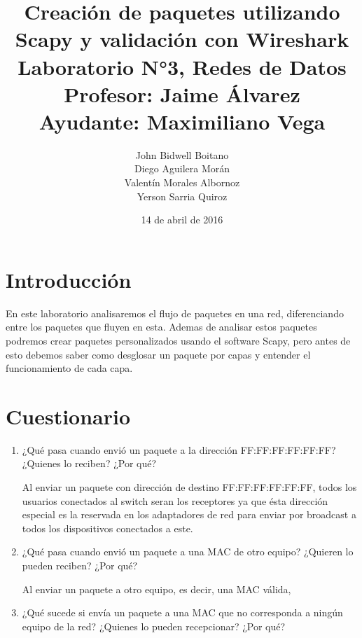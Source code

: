 \documentclass[spanish]{udpreport}
\begin{document}
\title{
	Creación de paquetes utilizando Scapy y validación con Wireshark\\[2ex]
	\normalsize
	Laboratorio N°3, Redes de Datos\\
    Profesor: Jaime Álvarez\\
	Ayudante: Maximiliano Vega
    }
\author{John Bidwell Boitano\\ Diego Aguilera Morán \\ Valentín Morales Albornoz \\ Yerson Sarria Quiroz}
\date{14 de abril de 2016}
\maketitle

\tableofcontents

\chapter{Introducción}
En este laboratorio analisaremos el flujo de paquetes en una red, diferenciando entre los paquetes que fluyen en esta.
Ademas de analisar estos paquetes podremos crear paquetes personalizados usando el software Scapy, pero antes de esto debemos saber como desglosar un paquete por capas y entender el funcionamiento de cada capa.
\chapter{Cuestionario}
\begin{enumerate}

\item¿Qué  pasa  cuando  envió  un  paquete  a  la  dirección  FF:FF:FF:FF:FF:FF?  ¿Quienes 
lo reciben? ¿Por qué?

Al enviar un paquete con dirección de destino FF:FF:FF:FF:FF:FF, todos los usuarios conectados al switch seran los receptores ya que ésta dirección especial es la reservada en los adaptadores de red para enviar por broadcast a todos los dispositivos conectados a este.

\item¿Qué  pasa  cuando  envió  un  paquete  a  una  MAC  de  otro  equipo?  ¿Quieren  lo pueden reciben? ¿Por qué?

Al enviar un paquete a otro equipo, es decir, una MAC válida, 

\item¿Qué  sucede  si  envía  un  paquete  a  una  MAC  que  no  corresponda  a  ningún  equipo de la red? ¿Quienes lo pueden recepcionar? ¿Por qué?

\end{enumerate}
\end{document}
